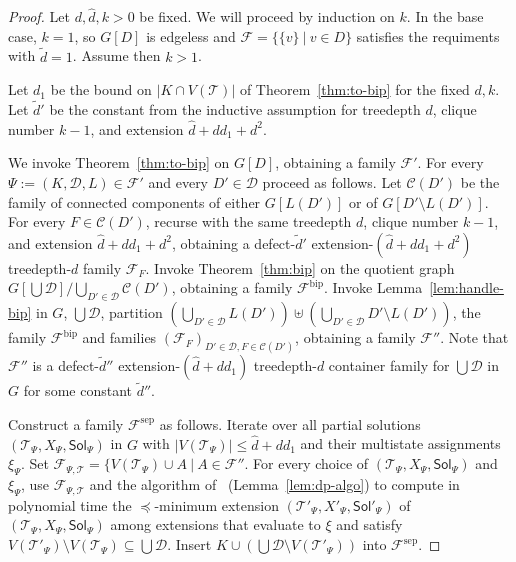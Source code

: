 \documentclass[11pt,a4paper]{article}
\theoremstyle{definition}
\def\T{\mathcal{T}}
\def\Sol{\mathsf{Sol}}
\begin{document}
\begin{proof}
Let $d,\widehat{d},k > 0$ be fixed. We will proceed by induction on $k$. 
In the base case, $k = 1$, so $G[D]$ is edgeless and
$\mathcal{F} = \{\{v\}~|~v \in D\}$ satisfies the requiments with $\widetilde{d}=1$. 
Assume then $k > 1$. 

Let $d_1$ be the bound on $|K \cap V(\T)|$ of Theorem~\ref{thm:to-bip}
for the fixed $d,k$.
Let $\widetilde{d}'$ be the constant from the inductive assumption for treedepth $d$,
clique number $k-1$, and extension $\widehat{d}+dd_1+d^2$. 

We invoke Theorem~\ref{thm:to-bip} on $G[D]$, obtaining a family $\mathcal{F}'$.
For every $\Psi := (K,\mathcal{D},L) \in \mathcal{F}'$ and 
every $D' \in \mathcal{D}$ proceed as follows.
Let $\mathcal{C}(D')$ be the family of connected components of either
$G[L(D')]$ or of $G[D' \setminus L(D')]$.
For every $F \in \mathcal{C}(D')$, recurse
with the same treedepth $d$, clique number $k-1$, and extension $\widehat{d}+dd_1+d^2$,
obtaining a defect-$\widetilde{d}'$ extension-$(\widehat{d}+dd_1+d^2)$ treedepth-$d$
family $\mathcal{F}_F$. 
Invoke Theorem~\ref{thm:bip} on the quotient graph $G[\bigcup \mathcal{D}]/\bigcup_{D' \in \mathcal{D}} \mathcal{C}(D')$, obtaining
a family $\mathcal{F}^{\mathrm{bip}}$. 
Invoke Lemma~\ref{lem:handle-bip} in $G$, $\bigcup \mathcal{D}$, partition $(\bigcup_{D' \in \mathcal{D}} L(D')) \uplus (\bigcup_{D' \in \mathcal{D}} D' \setminus L(D'))$,
the family $\mathcal{F}^{\mathrm{bip}}$ and families $(\mathcal{F}_F)_{D' \in \mathcal{D},F \in \mathcal{C}(D')}$,
obtaining a family $\mathcal{F}''$.
Note that $\mathcal{F}''$ is a defect-$\widetilde{d}''$ extension-$(\widehat{d}+dd_1)$
treedepth-$d$ container family for $\bigcup \mathcal{D}$ in $G$ for some constant $\widetilde{d}''$.

Construct a family $\mathcal{F}^\mathrm{sep}$ as follows. 
Iterate over all partial solutions $(\T_\Psi,X_\Psi,\Sol_\Psi)$ in $G$ with $|V(\T_\Psi)| \leq \widehat{d}+dd_1$ and their multistate assignments $\xi_\Psi$. 
Set $\mathcal{F}_{\Psi,\T} = \{ V(\T_\Psi) \cup A~|~A \in \mathcal{F}''$. 
For every choice of $(\T_\Psi,X_\Psi,\Sol_\Psi)$ and $\xi_\Psi$, use $\mathcal{F}_{\Psi,\T}$ 
and the algorithm of~\cite[Section~3]{DBLP:conf/soda/ChudnovskyMPPR24} (Lemma~\ref{lem:dp-algo}) to compute in polynomial time
the $\preceq$-minimum extension $(\T'_\Psi,X'_\Psi,\Sol'_\Psi)$ of $(\T_\Psi,X_\Psi,\Sol_\Psi)$ 
among extensions that evaluate to $\xi$ and satisfy $V(\T'_\Psi) \setminus V(\T_\Psi) \subseteq \bigcup \mathcal{D}$. 
Insert $K \cup (\bigcup \mathcal{D} \setminus V(\T'_\Psi))$ into $\mathcal{F}^\mathrm{sep}$.


\end{proof}
\end{document}
